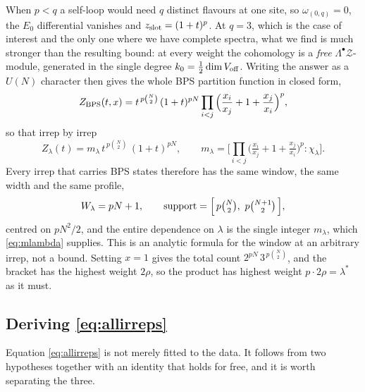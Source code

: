 \documentclass[10pt]{article}
\begin{document}
When $p<q$ a self-loop would need $q$ distinct flavours at one site, so $\omega_{(0,q)}=0$, the $E_0$
differential vanishes and $z_{\rm slot}=(1+t)^p$. At $q=3$, which is the case of interest and the only one where
we have complete spectra, what we find is much stronger than the resulting bound: at every weight the cohomology
is a \emph{free} $\Lambda^\bullet\mathcal Z$-module, generated in the single degree $k_0=\frac12\dim V_{\rm off}$.
Writing the answer as a $U(N)$ character then gives the whole BPS partition function in closed form,
\begin{equation}
Z_{\rm BPS}(t,x)=t^{\,p\binom N2}\,(1+t)^{pN}\prod_{i<j}\Big(\frac{x_i}{x_j}+1+\frac{x_j}{x_i}\Big)^{p},
\label{eq:allirreps}
\end{equation}
so that irrep by irrep
\begin{equation}
Z_\lambda(t)=m_\lambda\,t^{\,p\binom N2}\,(1+t)^{pN},
\qquad m_\lambda=\Big[\textstyle\prod_{i<j}\big(\tfrac{x_i}{x_j}+1+\tfrac{x_j}{x_i}\big)^{p}:\chi_\lambda\Big].
\label{eq:mlambda}
\end{equation}
Every irrep that carries BPS states therefore has the same window, the same width and the same profile,
\begin{equation}
W_\lambda=pN+1,\qquad \text{support}=\Big[\,p\tbinom N2,\ p\tbinom{N+1}2\,\Big],
\end{equation}
centred on $pN^2/2$, and the entire dependence on $\lambda$ is the single integer $m_\lambda$, which
\eqref{eq:mlambda} supplies. This is an analytic formula for the window at an arbitrary irrep, not a bound.
Setting $x=1$ gives the total count $2^{pN}\,3^{\,p\binom N2}$, and the bracket has the highest weight
$2\rho$, so the product has highest weight $p\cdot2\rho=\lambda^*$ as it must.

\subsection{Deriving \eqref{eq:allirreps}}

Equation \eqref{eq:allirreps} is not merely fitted to the data. It follows from two hypotheses together with an
identity that holds for free, and it is worth separating the three.
\end{document}
